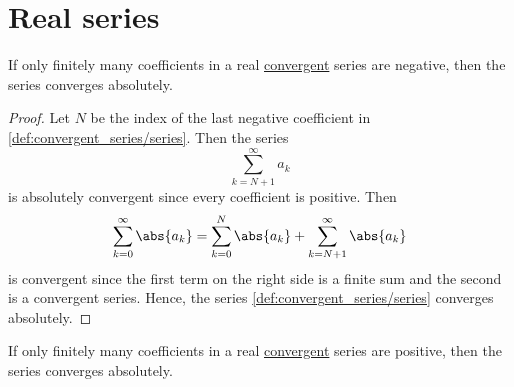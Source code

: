 \section{Real series}\label{sec:real_series}

\begin{proposition}\label{thm:almost_all_terms_positive_implies_absolute_convergent}
  If only finitely many coefficients in a real \hyperref[def:convergent_series]{convergent} series are negative, then the series converges absolutely.
\end{proposition}
\begin{proof}
  Let \( N \) be the index of the last negative coefficient in \eqref{def:convergent_series/series}. Then the series
  \begin{equation*}
    \sum_{k={N+1}}^\infty a_k
  \end{equation*}
  is absolutely convergent since every coefficient is positive. Then
  \begin{equation*}
    \sum_{k=0}^\infty \abs{a_k} = \sum_{k=0}^N \abs{a_k} + \sum_{k=N+1}^\infty \abs{a_k}
  \end{equation*}
  is convergent since the first term on the right side is a finite sum and the second is a convergent series. Hence, the series \eqref{def:convergent_series/series} converges absolutely.
\end{proof}

\begin{corollary}\label{thm:almost_all_terms_negative_implies_absolute_convergent}
  If only finitely many coefficients in a real \hyperref[def:convergent_series]{convergent} series are positive, then the series converges absolutely.
\end{corollary}

